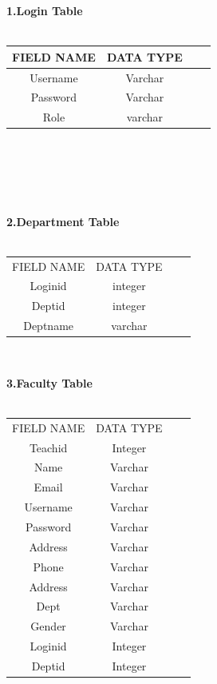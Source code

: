 \documentclass[a4paper, 12pt]{report}
\begin{document}
{\fontsize{14pt}{14pt}\selectfont\textbf{1.Login Table}
\\
\\
\begin{tabular}{|c|c|c|c|}
\hline 

FIELD NAME&DATA TYPE\\

\hline 

Username&Varchar\\ 
\hline 
Password&Varchar \\ 
\hline 
Role&varchar\\
\hline

\end{tabular} }\\
\\
\\
\\{\fontsize{14pt}{14pt}\selectfont\textbf{2.Department Table}
\\
\\
\begin{tabular}{|c|c|c|c|}
\hline 
FIELD NAME&DATA TYPE\\
Loginid&integer\\
\hline 
Deptid&integer\\
\hline
Deptname&varchar\\
\hline
\end{tabular} 
\\{\fontsize{14pt}{14pt}\selectfont\textbf{3.Faculty Table}
\\
\\
\begin{tabular}{|c|c|c|c|}
\hline 
FIELD NAME&DATA TYPE\\
Teachid&Integer\\
\hline 
Name&Varchar\\
\hline
Email&Varchar\\
\hline
Username&Varchar\\
\hline
Password&Varchar\\
\hline
Address&Varchar\\
\hline
Phone&Varchar\\
\hline
Address&Varchar\\
\hline
Dept&Varchar\\
\hline
Gender&Varchar\\
\hline
Loginid&Integer\\
\hline
Deptid&Integer\\
\hline


\end{tabular}}}
\end{document}
